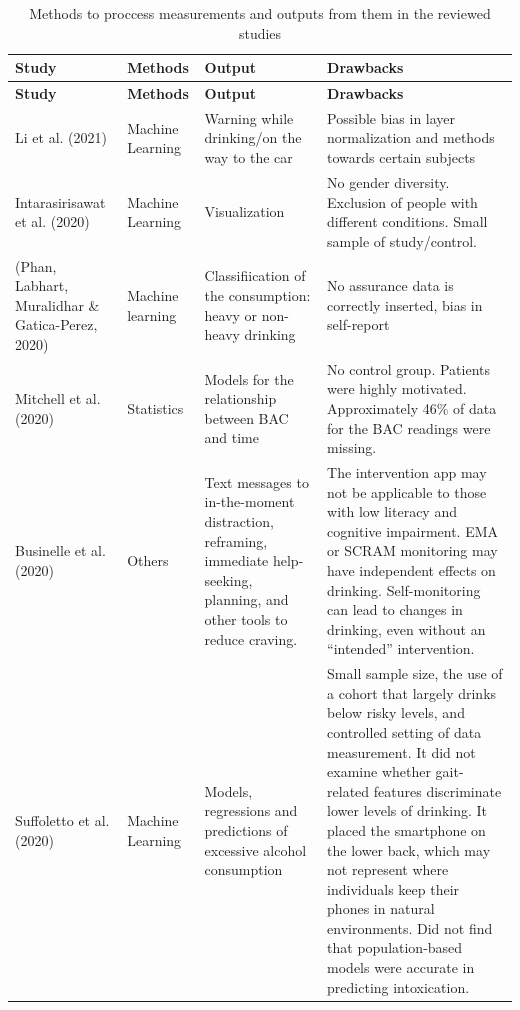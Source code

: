 \begin{longtable}{||p{} | p{} | p{} | p{}||}
\caption{Methods to proccess measurements and outputs from them in the reviewed studies}
\label{methods}
\endfirsthead
\hline
\textbf{Study} & \textbf{Methods} & \textbf{Output} & \textbf{Drawbacks} \\
\hline
\hline
%
\endhead
\hline
\hline
\textbf{Study} & \textbf{Methods} & \textbf{Output} & \textbf{Drawbacks} \\ \hline
Li et al. (2021) \cite{Li2021} & Machine Learning & Warning while drinking/on the way to the car & Possible bias in layer normalization and methods towards certain subjects \\ \hline
Intarasirisawat et al. (2020) \cite{Intarasirisawat2020} & Machine Learning & Visualization & No gender diversity. Exclusion of people with different conditions. Small sample of study/control. \\ \hline
(Phan, Labhart, Muralidhar \& Gatica-Perez, 2020) \cite{Phan2020211} & Machine learning & Classifiication of the consumption: heavy or non-heavy drinking & No assurance data is correctly inserted, bias in self-report \\ \hline
Mitchell et al. (2020) \cite{Mitchell2020297} & Statistics & Models for the relationship between BAC and time & No control group. Patients were highly motivated. Approximately 46\% of data for the BAC readings were missing.\\ \hline
Businelle et al. (2020) \cite{Businelle2020} & Others & Text messages to in-the-moment distraction, reframing, immediate help-seeking, planning, and other tools to reduce craving. & The intervention app may not be applicable to those with low literacy and cognitive impairment. EMA or SCRAM monitoring may have independent effects on drinking. Self-monitoring can lead to changes in drinking, even without an “intended” intervention. \\ \hline
Suffoletto et al. (2020) \cite{Suffoletto2020505} & Machine Learning & Models, regressions and predictions of excessive alcohol consumption & Small sample size, the use of a cohort that largely drinks below risky levels, and controlled setting of data measurement. It did not examine whether gait-related features discriminate lower levels of drinking. It placed the smartphone on the lower back, which may not represent where individuals keep their phones in natural environments. Did not find that population-based models were accurate in predicting intoxication. \\ \hline

\end{longtable}
